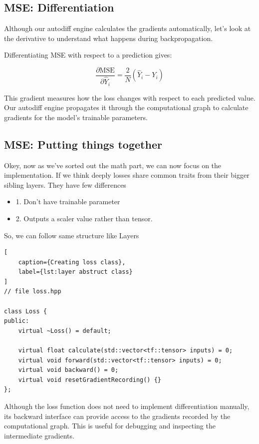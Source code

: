 \subsection{MSE: Differentiation}

Although our autodiff engine calculates the gradients
automatically, let's look at the derivative to
understand what happens during backpropagation.

Differentiating MSE with respect to a prediction gives:

\[
\frac{\partial \mathrm{MSE}}{\partial \hat{Y}_i}
=\frac{2}{N}(\hat{Y}_i-Y_i)
\]

This gradient measures how the loss changes with
respect to each predicted value. Our autodiff
engine propagates it through the computational
graph to calculate gradients for the model's
trainable parameters.

\subsection{MSE: Putting things together}

Okey, now as we've sorted out the math part, we
can now focus on the implementation. If we think
deeply losses share common traits from their
bigger sibling layers. They have few differences

\begin{itemize}
    \item 1. Don't have trainable parameter
    \item 2. Outputs a scaler value rather than
    tensor.
\end{itemize}

So, we can follow same structure like Layers

\begin{lstlisting}[
    caption={Creating loss class},
    label={lst:layer abstruct class}
]
// file loss.hpp

class Loss {
public:
    virtual ~Loss() = default;

    virtual float calculate(std::vector<tf::tensor> inputs) = 0;
    virtual void forward(std::vector<tf::tensor> inputs) = 0;
    virtual void backward() = 0;
    virtual void resetGradientRecording() {}
};
\end{lstlisting}

Although the loss function does not need to
implement differentiation manually, its backward
interface can provide access to the gradients
recorded by the computational graph. This is
useful for debugging and inspecting the
intermediate gradients.

